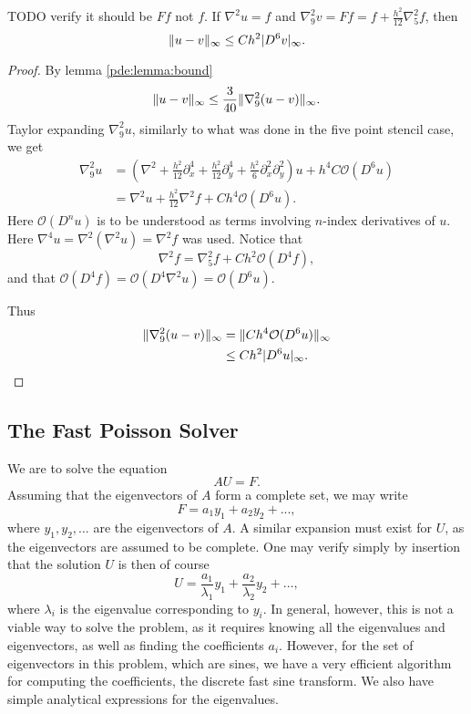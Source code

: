 \begin{theorem}
TODO verify it should be $F f$ not $f$.
If $\nabla^2 u = f$ and $\nabla_9^2 v = F f = f + \frac{h^2}{12} \nabla_5^2 f$, then
$$
\lVert u - v \rVert_\infty \leq Ch^2 \lvert D^6 v\rvert_\infty.
$$
\end{theorem}
\begin{proof}
By lemma \ref{pde:lemma:bound}
$$
\lVert u - v \rVert_\infty \leq \frac{3}{40} \lVert \nabla_9^2 (u  - v) \rVert_\infty.
$$
Taylor expanding $\nabla_9^2 u$, similarly to what was done in the five point stencil case, we get
\begin{align*}
  \nabla_9^2 u
  &= (\nabla^2
  + \frac{h^2}{12} \partial_x^4
  + \frac{h^2}{12} \partial_y^4
  + \frac{h^2}{6} \partial_x^2 \partial_y^2
  ) u + h^4 C \mathcal{O}(D^6 u)\\
  &= \nabla^2 u + \frac{h^2}{12} \nabla^2 f + C h^4 \mathcal{O}(D^6 u).
\end{align*}
Here $\mathcal{O}(D^n u)$ is to be understood as terms involving $n$-index derivatives of $u$.
Here $\nabla^4 u = \nabla^2 (\nabla^2 u) = \nabla^2 f$ was used.
Notice that
$$
\nabla^2 f = \nabla_5^2 f + C h^2 \mathcal{O}(D^4 f),
$$
and that $\mathcal{O}(D^4 f)
= \mathcal{O}(D^4 \nabla^2 u)
= \mathcal{O}(D^6 u)$.

Thus
\begin{align}
  \lVert \nabla_9^2 (u  - v) \rVert_\infty
  &= \lVert Ch^4 \mathcal{O}(D^6u) \rVert_\infty\\
  &\leq Ch^2 \lvert D^6 u\rvert_\infty.
\end{align}
\end{proof}



\subsection{The Fast Poisson Solver}
We are to solve the equation
$$
A U = F.
$$
Assuming that the eigenvectors of $A$ form a complete set, we may write
$$
F = a_1 y_1 + a_2 y_2 + ...,
$$
where $y_1, y_2, \dots$ are the eigenvectors of $A$.
A similar expansion must exist for $U$, as the eigenvectors are assumed to be complete.
One may verify simply by insertion that the solution $U$ is then of course
$$
U =
\frac{a_1}{\lambda_1} y_1
+ \frac{a_2}{\lambda_2} y_2
+ \dots,
$$
where $\lambda_i$ is the eigenvalue corresponding to $y_i$.
In general, however, this is not a viable way to solve the problem, as it requires knowing all the eigenvalues and eigenvectors, as well as finding the coefficients $a_i$.
However, for the set of eigenvectors in this problem, which are sines, we have a very efficient algorithm for computing the coefficients, the discrete fast sine transform.
We also have simple analytical expressions for the eigenvalues.

